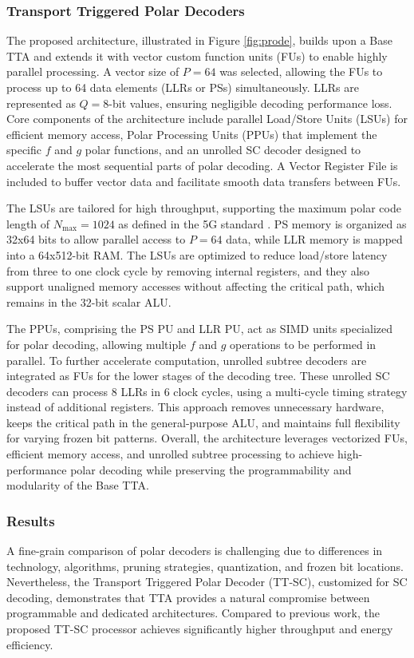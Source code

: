 \documentclass[11pt]{report}
\begin{document}
\subsubsection{Transport Triggered Polar Decoders} The proposed architecture, illustrated in Figure \ref{fig:prode}, builds upon a Base TTA and extends it with vector custom function units (FUs) to enable highly parallel processing. A vector size of $P=64$ was selected, allowing the FUs to process up to 64 data elements (LLRs or PSs) simultaneously. LLRs are represented as $Q=8$-bit values, ensuring negligible decoding performance loss. Core components of the architecture include parallel Load/Store Units (LSUs) for efficient memory access, Polar Processing Units (PPUs) that implement the specific $f$ and $g$ polar functions, and an unrolled SC decoder designed to accelerate the most sequential parts of polar decoding. A Vector Register File is included to buffer vector data and facilitate smooth data transfers between FUs.

The LSUs are tailored for high throughput, supporting the maximum polar code length of $N_\text{max}=1024$ as defined in the 5G standard \cite{ETSI2018}. PS memory is organized as 32x64 bits to allow parallel access to $P=64$ data, while LLR memory is mapped into a 64x512-bit RAM. The LSUs are optimized to reduce load/store latency from three to one clock cycle by removing internal registers, and they also support unaligned memory accesses without affecting the critical path, which remains in the 32-bit scalar ALU.

The PPUs, comprising the PS PU and LLR PU, act as SIMD units specialized for polar decoding, allowing multiple $f$ and $g$ operations to be performed in parallel. To further accelerate computation, unrolled subtree decoders are integrated as FUs for the lower stages of the decoding tree. These unrolled SC decoders can process 8 LLRs in 6 clock cycles, using a multi-cycle timing strategy instead of additional registers. This approach removes unnecessary hardware, keeps the critical path in the general-purpose ALU, and maintains full flexibility for varying frozen bit patterns. Overall, the architecture leverages vectorized FUs, efficient memory access, and unrolled subtree processing to achieve high-performance polar decoding while preserving the programmability and modularity of the Base TTA.

\subsubsection{Results} A fine-grain comparison of polar decoders is challenging due to differences in technology, algorithms, pruning strategies, quantization, and frozen bit locations. Nevertheless, the Transport Triggered Polar Decoder (TT-SC), customized for SC decoding, demonstrates that TTA provides a natural compromise between programmable and dedicated architectures. Compared to previous work, the proposed TT-SC processor achieves significantly higher throughput and energy efficiency.
\end{document}
